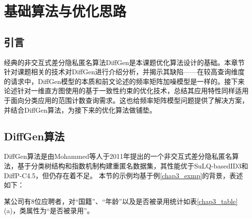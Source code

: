 
\raggedbottom
\chapter{基础算法与优化思路}
\label{chap:algorithm}

\section{引言}
经典的非交互式差分隐私匿名算法DiffGen是本课题优化算法设计的基础。本章节针对课题相关的技术对DiffGen进行介绍分析，并揭示其缺陷——在较高查询维度的请求中，DiffGen模型的本质和前文论述的频率矩阵加噪模型是一样的。接下来论述针对一维直方图使用的基于一致性约束的优化技术，总结其应用特性同样适用于面向分类应用的范围计数查询需求。这也给频率矩阵模型问题提供了解决方案，并结合DiffGen算法，为接下来的优化算法做铺垫。

\section{DiffGen算法}

DiffGen算法是由Mohammed等人于2011年提出的一个非交互式差分隐私匿名算法\cite{DiffGen}，基于分类树结构和指数机制构建重匿名数据集，其性能优于SuLQ-basedID3和DiffP-C4.5，但仍存在着不足。
本节的示例均基于例\ref{chap3_exmp}的背景，表述如下：
\begin{exmp}
	\label{chap3_exmp}
	某公司有8位应聘者，对“国籍”、“年龄”以及是否被录用统计如表\ref{chap3_table}(a)，类属性为“是否被录用”。
\end{exmp}

